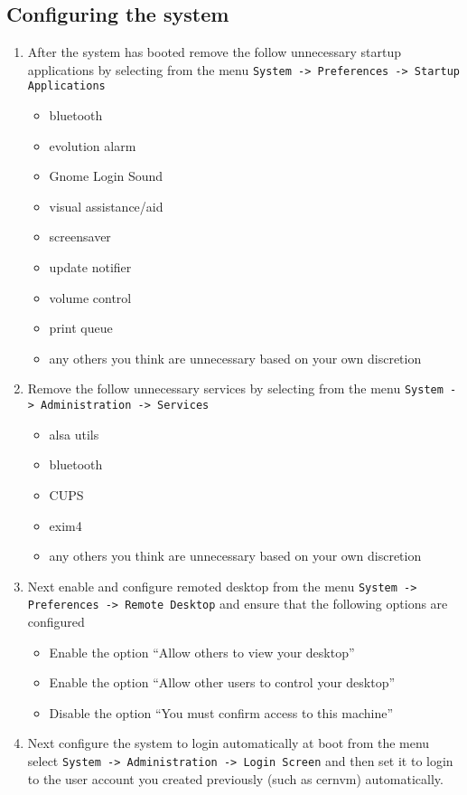 \subsection{Configuring the system}
\label{sec:debianconfig}
\begin{enumerate}
\item After the system has booted remove the follow unnecessary startup applications by selecting from the menu  
\verb|System -> Preferences -> Startup Applications|
\begin{itemize}
\item	bluetooth
\item	evolution alarm
\item	Gnome Login Sound
\item	visual assistance/aid
\item	screensaver
\item	update notifier
\item	volume control
\item	print queue
\item	any others you think are unnecessary based on your own discretion
\end{itemize}

\item Remove the follow unnecessary services by selecting from the menu \verb|System -> Administration -> Services|
\begin{itemize}
\item	alsa utils
\item	bluetooth
\item	CUPS
\item	exim4
\item	any others you think are unnecessary based on your own discretion
\end{itemize}

\item Next enable and configure remoted desktop from the menu \verb|System -> Preferences -> Remote Desktop| and ensure
that the following options are configured
\begin{itemize}
\item	Enable the option ``Allow others to view your desktop''
\item	Enable the option ``Allow other users to control your desktop''
\item	Disable the option ``You must confirm access to this machine''
\end{itemize}

\item Next configure the system to login automatically at boot from the menu select \verb|System -> Administration -> Login Screen|
and then set it to login to the user account you created previously (such as cernvm) automatically.


\end{enumerate}
